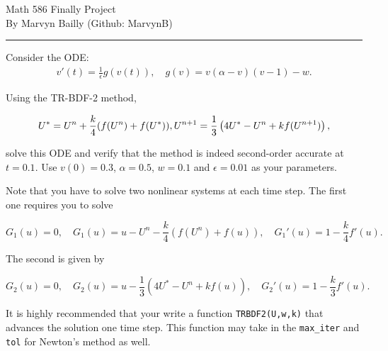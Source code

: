 \documentclass[12pt]{report}
\begin{document}
\large

\begin{center}
 Math 586 Finally Project\\
 By Marvyn Bailly (Github: MarvynB)\\
\end{center}

\normalsize

\hrule



\begin{problem}
    Consider the ODE:
\begin{align*} v'(t) = \frac 1 \epsilon g(v(t)), \quad g(v) = v (\alpha - v) (v-1) - w. \end{align*}

Using the TR-BDF-2 method,

$$U^* = U^n + \frac k 4 (f(U^n) + f(U^*)),\\
U^{n+1} = \frac 1 3 \left( 4 U^* -U^n + k f(U^{n+1})\right),$$

solve this ODE and verify that the method is indeed second-order accurate at $t = 0.1$.  Use $v(0) = 0.3$, $\alpha= 0.5$, $w = 0.1$ and $\epsilon = 0.01$ as your parameters.

Note that you have to solve two nonlinear systems at each time step.  The first one requires you to solve

$$ G_1(u) = 0, \quad G_1(u) = u - U^n - \frac k 4 (f(U^n) + f(u)), \quad G_1'(u) = 1 - \frac k 4 f'(u).$$

The second is given by

$$ G_2(u) = 0, \quad G_2(u) = u - \frac 1 3 \left( 4 U^* -U^n + k f(u)\right), \quad G_2'(u) = 1 - \frac k 3 f'(u).$$

It is highly recommended that your write a function \verb`TRBDF2(U,w,k)` that advances the solution one time step.  This function may take in the \verb`max_iter` and \verb`tol` for Newton's method as well.
\end{problem}
\end{document}
